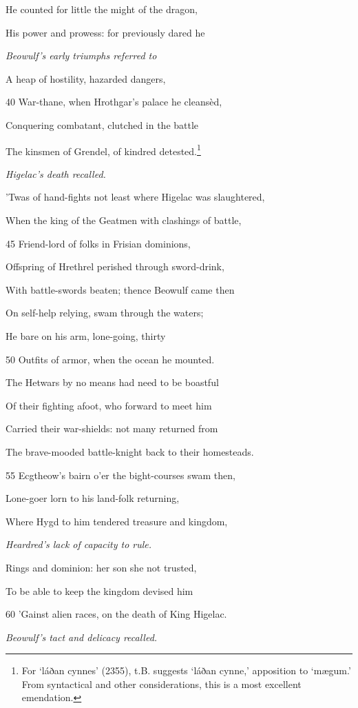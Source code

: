 He counted for little the might of the dragon,

His power and prowess: for previously dared he

\emph{Beowulf’s early
triumphs referred
to}

A heap of hostility, hazarded dangers,

40
War-thane, when Hrothgar’s palace he cleansèd,

Conquering combatant, clutched in the battle

The kinsmen of Grendel, of kindred detested.\footnote{For ‘láðan cynnes’ (2355), t.B. suggests ‘láðan cynne,’ apposition to
‘mægum.’ From syntactical and other considerations, this is a most excellent
emendation.}

\emph{Higelac’s death
recalled.}

’Twas of hand-fights not least where Higelac was slaughtered,

When the king of the Geatmen with clashings of battle,

45
Friend-lord of folks in Frisian dominions,

Offspring of Hrethrel perished through sword-drink,

With battle-swords beaten; thence Beowulf came then

On self-help relying, swam through the waters;

He bare on his arm, lone-going, thirty

50
Outfits of armor, when the ocean he mounted.

The Hetwars by no means had need to be boastful

Of their fighting afoot, who forward to meet him

Carried their war-shields: not many returned from

The brave-mooded battle-knight back to their homesteads.

55
Ecgtheow’s bairn o’er the bight-courses swam then,

Lone-goer lorn to his land-folk returning,

Where Hygd to him tendered treasure and kingdom,

\emph{Heardred’s lack of
capacity to rule.}

Rings and dominion: her son she not trusted,

To be able to keep the kingdom devised him

60
’Gainst alien races, on the death of King Higelac.

\emph{Beowulf’s tact and
delicacy recalled.}

